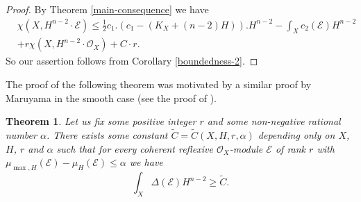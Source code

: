 \documentclass[twoside, 11pt]{article}
\theoremstyle{plain}
\newtheorem{Theorem}[Thm]{\sc Theorem}
\theoremstyle{definition}
\theoremstyle{remark}
\newcommand{\cE}{{\mathcal E}}
\newcommand{\cO}{{\mathcal O}}
\begin{document}
\begin{proof}
By Theorem \ref{main-consequence} we have
\begin{align*}
&\chi (X, H^{n-2} \cdot \cE) \le \frac{1}{2}   c_1.(c_1-(K_X+(n-2)H)). H^{n-2} 
 -\int _X c _2 (\cE)H^{n-2}   \\
 &  +r\chi (X, H^{n-2} \cdot \cO_X) + C\cdot r.
    \end{align*}
So our assertion follows from Corollary \ref{boundedness-2}.
\end{proof}

\medskip

The proof of the following theorem was motivated by a similar proof by Maruyama in the smooth case (see the proof of 
\cite[Corollary 2.10]{Ma}).

\begin{Theorem}\label{Bogomolov's-inequality}
Let us fix some positive integer $r$ and some non-negative rational number $\alpha$.
There exists some constant $\tilde C=\tilde C(X,H,r,\alpha)$ depending only on $X$, $H$, $r$ and $\alpha$ such that for every coherent
reflexive    $\cO_X$-module $\cE$ of rank $r$ with
$\mu _{\max ,H } (\cE)-\mu _H (\cE)\le \alpha$ we have
$$\int _X \Delta (\cE) H^{n-2}\ge \tilde C.$$
\end{Theorem}
\end{document}
